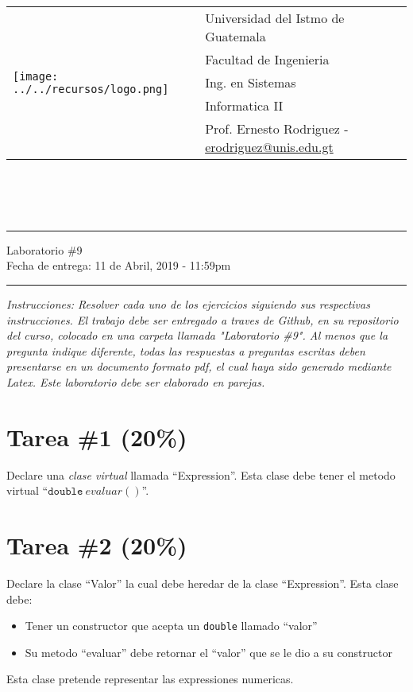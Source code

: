 \documentclass{article}
\newcommand{\horrule}[1]{\rule{\linewidth}{#1}}
\begin{document}
\begin{tabular}{l l}
\multirow{5}{*}{\texttt{[image: ../../recursos/logo.png]}} & Universidad del Istmo de Guatemala \\
 & Facultad de Ingenieria \\
 & Ing. en Sistemas \\
 & Informatica II \\
 & Prof. Ernesto Rodriguez - \href{mailto:erodriguez@unis.edu.gt}{erodriguez@unis.edu.gt} \\
\end{tabular}
\\\\\\

\begin{center}
        \horrule{0.5pt}
        \huge{Laboratorio \#9} \\
        \large{Fecha de entrega: 11 de Abril, 2019 - 11:59pm} \\
        \horrule{1pt}
\end{center}

\emph{Instrucciones: Resolver cada uno de los ejercicios siguiendo sus respectivas
instrucciones. El trabajo debe ser entregado a traves de Github, en su repositorio del curso, colocado en una carpeta llamada "Laboratorio \#9".
Al menos que la pregunta indique diferente, todas las respuestas a preguntas escritas deben presentarse en
un documento formato pdf, el cual haya sido generado mediante Latex. Este laboratorio
debe ser elaborado en parejas.}

\section*{Tarea \#1 (20\%)}

Declare una \emph{clase virtual} llamada ``Expression''. Esta clase debe tener el metodo
virtual ``$\mathtt{double}\ evaluar()$''.

\section*{Tarea \#2 (20\%)}

Declare la clase ``Valor'' la cual debe heredar de la clase ``Expression''. Esta clase
debe:
\begin{itemize}
        \item{Tener un constructor que acepta un \texttt{double} llamado ``valor''}
        \item{Su metodo ``evaluar'' debe retornar el ``valor'' que se le dio a su constructor}
\end{itemize}
Esta clase pretende representar las expressiones numericas.
                        
\end{document}
